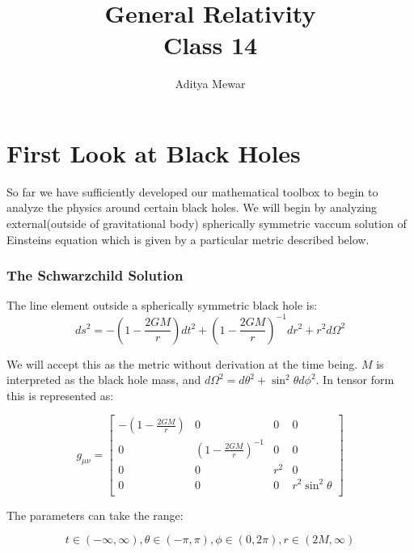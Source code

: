 \documentclass[10pt]{article}
\title{{\Huge General Relativity}\\{\Large{Class 14}}} %
\author{Aditya Mewar}
\begin{document}
	\maketitle
	\flushbottom
	\newpage
	\pagestyle{fancynotes}
    
\part{First Look at Black Holes}
So far we have sufficiently developed our mathematical toolbox to begin to analyze the physics around certain black holes. We will begin by analyzing external(outside of gravitational body) spherically symmetric vaccum solution of Einsteins equation which is given by a particular metric described below. 

\section{The Schwarzchild Solution} \label{sec:rev_dual_vectors}
The line element outside a spherically symmetric black hole is: 
\begin{equation}
 ds^2 =- (1 -\frac{2GM}{r})dt^2 + (1-\frac{2GM}{r})^{-1} dr^2 + r^2 d\Omega^2
 \label{eq:metric}
\end{equation}


We will accept this as the metric without derivation at the time being. $M$ is interpreted as the black hole mass, and $d\Omega^2 = d\theta^2 + \sin^2{\theta}d\phi^2$. In tensor form this is represented as: 

\begin{equation}
g_{\mu\nu} = \begin{bmatrix}
       - (1 -\frac{2GM}{r})   & 0 & 0 &0 \\
   0     &  (1-\frac{2GM}{r})^{-1} &0 & 0 \\
   0&0&r^2&0\\
    0   & 0 & 0 & r^2 \sin^2{\theta} \\
\end{bmatrix}
\end{equation}

The parameters can take the range:

\begin{equation}
t \in (-\infty,\infty),
\theta \in (-\pi,\pi),
\phi \in (0,2\pi),
r  \in (2M, \infty)
\end{equation}
\end{document}
